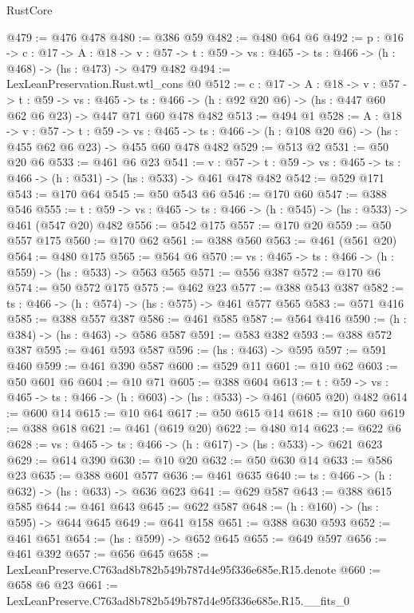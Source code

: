 \begin{lexlean}{RustCore}
\begin{coremodule}
@479 := @476 @478
@480 := @386 @59
@482 := @480 @64 @6
@492 := {p : @16} ->
  {c : @17} ->
  {A : @18} ->
  {v : @57} -> {t : @59} -> {vs : @465} -> {ts : @466} -> (h : @468) -> (hs : @473) -> @479 @482
@494 := LexLeanPreservation.Rust.wtl_cons @0
@512 := {c : @17} ->
  {A : @18} ->
  {v : @57} ->
  {t : @59} ->
  {vs : @465} ->
  {ts : @466} -> (h : @92 @20 @6) -> (hs : @447 @60 @62 @6 @23) -> @447 @71 @60 @478 @482
@513 := @494 @1
@528 := {A : @18} ->
  {v : @57} ->
  {t : @59} ->
  {vs : @465} -> {ts : @466} -> (h : @108 @20 @6) -> (hs : @455 @62 @6 @23) -> @455 @60 @478 @482
@529 := @513 @2
@531 := @50 @20 @6
@533 := @461 @6 @23
@541 := {v : @57} ->
  {t : @59} -> {vs : @465} -> {ts : @466} -> (h : @531) -> (hs : @533) -> @461 @478 @482
@542 := @529 @171
@543 := @170 @64
@545 := @50 @543 @6
@546 := @170 @60
@547 := @388 @546
@555 := {t : @59} -> {vs : @465} -> {ts : @466} -> (h : @545) -> (hs : @533) -> @461 (@547 @20) @482
@556 := @542 @175
@557 := @170 @20
@559 := @50 @557 @175
@560 := @170 @62
@561 := @388 @560
@563 := @461 (@561 @20)
@564 := @480 @175
@565 := @564 @6
@570 := {vs : @465} -> {ts : @466} -> (h : @559) -> (hs : @533) -> @563 @565
@571 := @556 @387
@572 := @170 @6
@574 := @50 @572 @175
@575 := @462 @23
@577 := @388 @543 @387
@582 := {ts : @466} -> (h : @574) -> (hs : @575) -> @461 @577 @565
@583 := @571 @416
@585 := @388 @557 @387
@586 := @461 @585
@587 := @564 @416
@590 := (h : @384) -> (hs : @463) -> @586 @587
@591 := @583 @382
@593 := @388 @572 @387
@595 := @461 @593 @587
@596 := (hs : @463) -> @595
@597 := @591 @460
@599 := @461 @390 @587
@600 := @529 @11
@601 := @10 @62
@603 := @50 @601 @6
@604 := @10 @71
@605 := @388 @604
@613 := {t : @59} -> {vs : @465} -> {ts : @466} -> (h : @603) -> (hs : @533) -> @461 (@605 @20) @482
@614 := @600 @14
@615 := @10 @64
@617 := @50 @615 @14
@618 := @10 @60
@619 := @388 @618
@621 := @461 (@619 @20)
@622 := @480 @14
@623 := @622 @6
@628 := {vs : @465} -> {ts : @466} -> (h : @617) -> (hs : @533) -> @621 @623
@629 := @614 @390
@630 := @10 @20
@632 := @50 @630 @14
@633 := @586 @23
@635 := @388 @601 @577
@636 := @461 @635
@640 := {ts : @466} -> (h : @632) -> (hs : @633) -> @636 @623
@641 := @629 @587
@643 := @388 @615 @585
@644 := @461 @643
@645 := @622 @587
@648 := (h : @160) -> (hs : @595) -> @644 @645
@649 := @641 @158
@651 := @388 @630 @593
@652 := @461 @651
@654 := (hs : @599) -> @652 @645
@655 := @649 @597
@656 := @461 @392
@657 := @656 @645
@658 := LexLeanPreserve.C763ad8b782b549b787d4e95f336e685e.R15.denote
@660 := @658 @6 @23
@661 := LexLeanPreserve.C763ad8b782b549b787d4e95f336e685e.R15.__fits_0

\end{coremodule}
\end{lexlean}

